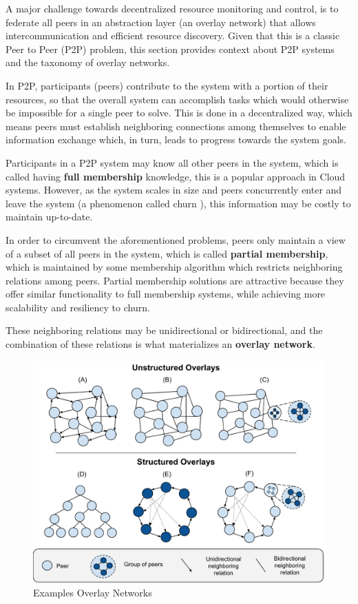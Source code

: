 

A major challenge towards decentralized resource monitoring and control, is to federate all peers in an abstraction layer (an overlay network) that allows intercommunication and efficient resource discovery. Given that this is a classic Peer to Peer (P2P) problem, this section provides context about P2P systems and the taxonomy of overlay networks.

In P2P, participants (peers) contribute to the system with a portion of their resources, so that the overall system can accomplish tasks which would otherwise be impossible for a single peer to solve. This is done in a decentralized way, which means peers must establish neighboring connections among themselves to enable information exchange which, in turn, leads to progress towards the system goals. 

Participants in a P2P system may know all other peers in the system, which is called having \textbf{full membership} knowledge, this is a popular approach in Cloud systems. However, as the system scales in size and peers concurrently enter and leave the system (a phenomenon called churn \cite{stutzbach2006understanding}), this information may be costly to maintain up-to-date. 

In order to circumvent the aforementioned problems, peers only maintain a view of a subset of all peers in the system, which is called \textbf{partial membership}, which is maintained by some membership algorithm which restricts neighboring relations among peers. Partial membership solutions are attractive because they offer similar functionality to full membership systems, while achieving more scalability and resiliency to churn. 

These neighboring relations may be unidirectional or bidirectional, and the combination of these relations is what materializes an \textbf{overlay network}.

\begin{figure}[h]
    \centering
    \includegraphics[width=\linewidth]{Figures/overlay_networks.pdf}
    \caption{Examples Overlay Networks}
    \label{fig:overlay_networks}
\end{figure}


